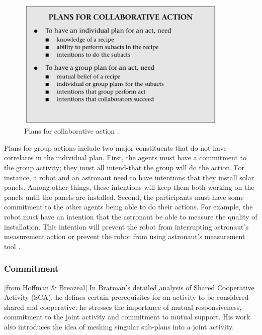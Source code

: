 \documentclass[11pt]{article}
\begin{document}
\begin{figure}[tbh]
  \center
  \includegraphics[width=0.9\textwidth]{figure/plans.png}
  \caption{Plans for collaborative action \cite{grosz:collaborative-systems}.}
  \label{fig:plans}
\end{figure}

Plans for group actions include two major constituents that do not have
correlates in the individual plan. First, the agents must have a commitment to
the group activity; they must all intend-that the group will do the action. For
instance, a robot and an astronaut need to have intentions that they install
solar panels. Among other things, these intentions will keep them both working
on the panels until the panels are installed. Second, the participants must have
some commitment to the other agents being able to do their actions. For example,
the robot must have an intention that the astronaut be able to measure the
quality of installation. This intention will prevent the robot from interrupting
astronaut's measurement action or prevent the robot from using astronaut's
measurement tool \cite{grosz:plans-discourse}
\cite{grosz:collaborative-systems}.

\subsubsection{Commitment}

[from Hoffman \& Breazeal] In Bratman’s detailed analysis of Shared Cooperative
Activity (SCA), he defines certain prerequisites for an activity to be
considered shared and cooperative: he stresses the importance of mutual
responsiveness, commitment to the joint activity and commitment to mutual
support. His work also introduces the idea of meshing singular sub-plans into a
joint activity.
\end{document}
